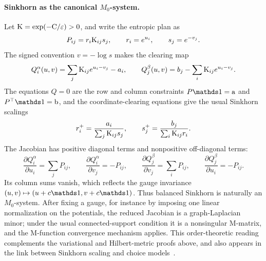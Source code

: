 \paragraph{Sinkhorn as the canonical \(M_0\)-system.}
Let \(\mathrm{K}=\exp(-\mathrm{C}/\varepsilon)>0\), and write the entropic plan as
\[
	P_{ij}=r_i\mathrm{K}_{ij}s_j,
	\qquad r_i=e^{u_i},\qquad s_j=e^{-v_j}.
\]
The signed convention \(v=-\log s\) makes the clearing map
\[
	Q_i^\alpha(u,v)=\sum_j\mathrm{K}_{ij}e^{u_i-v_j}-a_i,
	\qquad
	Q_j^\beta(u,v)=b_j-\sum_i\mathrm{K}_{ij}e^{u_i-v_j}.
\]
The equations \(Q=0\) are the row and column constraints \(P\ones=\a\) and \(P^\top\ones=\b\), and the coordinate-clearing equations give the usual Sinkhorn scalings
\[
	r_i^+=\frac{a_i}{\sum_j\mathrm{K}_{ij}s_j},
	\qquad
	s_j^+=\frac{b_j}{\sum_i\mathrm{K}_{ij}r_i}.
\]
The Jacobian has positive diagonal terms and nonpositive off-diagonal terms:
\[
	\frac{\partial Q_i^\alpha}{\partial u_i}=\sum_jP_{ij},
	\qquad
	\frac{\partial Q_i^\alpha}{\partial v_j}=-P_{ij},
	\qquad
	\frac{\partial Q_j^\beta}{\partial v_j}=\sum_iP_{ij},
	\qquad
	\frac{\partial Q_j^\beta}{\partial u_i}=-P_{ij}.
\]
Its column sums vanish, which reflects the gauge invariance \((u,v)\mapsto(u+c\ones,v+c\ones)\).  Thus balanced Sinkhorn is naturally an \(M_0\)-system.  After fixing a gauge, for instance by imposing one linear normalization on the potentials, the reduced Jacobian is a graph-Laplacian minor; under the usual connected-support condition it is a nonsingular M-matrix, and the M-function convergence mechanism applies.  This order-theoretic reading complements the variational and Hilbert-metric proofs above, and also appears in the link between Sinkhorn scaling and choice models~\cite{QuGalichonUgander2023SinkhornChoice}.

